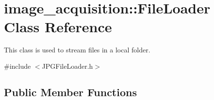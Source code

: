 \hypertarget{classimage__acquisition_1_1_file_loader}{}\section{image\+\_\+acquisition\+:\+:File\+Loader Class Reference}
\label{classimage__acquisition_1_1_file_loader}


This class is used to stream files in a local folder.  




{\ttfamily \#include $<$J\+P\+G\+File\+Loader.\+h$>$}

\subsection*{Public Member Functions}
